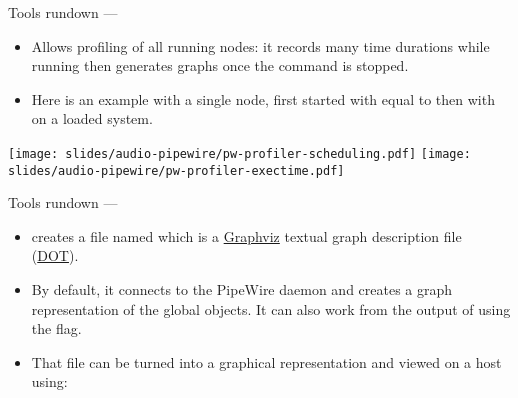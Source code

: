 \begin{frame}{Tools rundown — }
  \begin{itemize}

  \item Allows profiling of all running nodes: it records many time
    durations while running then generates graphs once the command is
    stopped.

  \item Here is an example with a single  node, first
    started with  equal to
     then with  on a loaded
    system.

  \end{itemize}

  \begin{center}
    \texttt{[image: slides/audio-pipewire/pw-profiler-scheduling.pdf]}
    \texttt{[image: slides/audio-pipewire/pw-profiler-exectime.pdf]}
  \end{center}
\end{frame}



\begin{frame}{Tools rundown — }
  \begin{itemize}

  \item {} creates a file named  which is a
    \href{https://graphviz.org/}{Graphviz} textual graph description
    file (\href{https://en.wikipedia.org/wiki/DOT_(graph_description_language)}{DOT}).

  \item By default, it connects to the PipeWire daemon and creates a
    graph representation of the global objects. It can also work from
    the output of  using the  flag.

  \item That file can be turned into a graphical representation and
    viewed on a host using:\\

  \end{itemize}
\end{frame}



